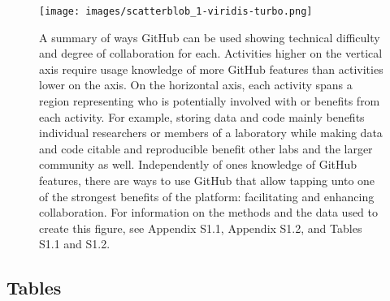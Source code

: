\begin{figure}
\hypertarget{fig:scatterblob}{%
\centering
\texttt{[image: images/scatterblob\_1-viridis-turbo.png]}
\caption{A summary of ways GitHub can be used showing technical difficulty and degree of collaboration for each. Activities higher on the vertical axis require usage knowledge of more GitHub features than activities lower on the axis. On the horizontal axis, each activity spans a region representing who is potentially involved with or benefits from each activity. For example, storing data and code mainly benefits individual researchers or members of a laboratory while making data and code citable and reproducible benefit other labs and the larger community as well. Independently of ones knowledge of GitHub features, there are ways to use GitHub that allow tapping unto one of the strongest benefits of the platform: facilitating and enhancing collaboration. For information on the methods and the data used to create this figure, see Appendix S1.1, Appendix S1.2, and Tables S1.1 and S1.2.}\label{fig:scatterblob}
}
\end{figure}

\hypertarget{tables}{%
\subsection{Tables}\label{tables}}

